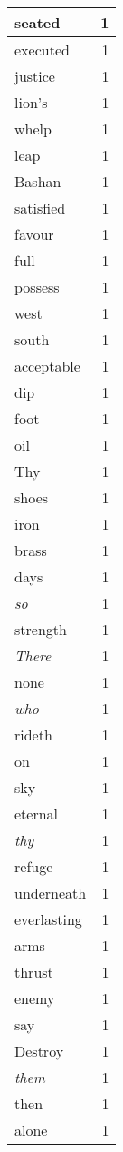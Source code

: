 \begin{center}
\begin{longtable}{l|r}
seated & 1 \\ \hline
executed & 1 \\ \hline
justice & 1 \\ \hline
lion's & 1 \\ \hline
whelp & 1 \\ \hline
leap & 1 \\ \hline
Bashan & 1 \\ \hline
satisfied & 1 \\ \hline
favour & 1 \\ \hline
full & 1 \\ \hline
possess & 1 \\ \hline
west & 1 \\ \hline
south & 1 \\ \hline
acceptable & 1 \\ \hline
dip & 1 \\ \hline
foot & 1 \\ \hline
oil & 1 \\ \hline
Thy & 1 \\ \hline
shoes & 1 \\ \hline
iron & 1 \\ \hline
brass & 1 \\ \hline
days & 1 \\ \hline
\emph{so} & 1 \\ \hline
strength & 1 \\ \hline
\emph{There} & 1 \\ \hline
none & 1 \\ \hline
\emph{who} & 1 \\ \hline
rideth & 1 \\ \hline
on & 1 \\ \hline
sky & 1 \\ \hline
eternal & 1 \\ \hline
\emph{thy} & 1 \\ \hline
refuge & 1 \\ \hline
underneath & 1 \\ \hline
everlasting & 1 \\ \hline
arms & 1 \\ \hline
thrust & 1 \\ \hline
enemy & 1 \\ \hline
say & 1 \\ \hline
Destroy & 1 \\ \hline
\emph{them} & 1 \\ \hline
then & 1 \\ \hline
alone & 1 \\ \hline

\end{longtable}
\end{center}
